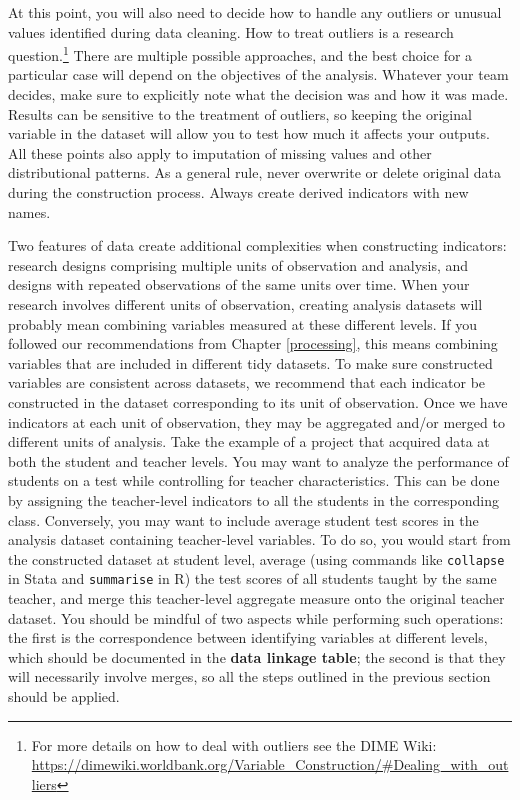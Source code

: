 \documentclass[
]{book}
\begin{document}
At this point, you will also need to decide
how to handle any outliers or unusual values identified during data cleaning.
How to treat outliers is a research question.\footnote{For more details on how to deal with outliers
  see the DIME Wiki:
  \url{https://dimewiki.worldbank.org/Variable_Construction/\#Dealing_with_outliers}}
There are multiple possible approaches,
and the best choice for a particular case
will depend on the objectives of the analysis.
Whatever your team decides, make sure to explicitly note
what the decision was and how it was made.
Results can be sensitive to the treatment of outliers,
so keeping the original variable in the dataset
will allow you to test how much it affects your outputs.
All these points also apply to imputation of missing values and other distributional patterns.
As a general rule, never overwrite or delete original data during the construction process.
Always create derived indicators with new names.

Two features of data create additional complexities when constructing indicators:
research designs comprising multiple units of observation and analysis,
and designs with repeated observations of the same units over time.
When your research involves different units of observation,
creating analysis datasets will probably mean combining variables measured at these different levels.
If you followed our recommendations from Chapter \ref{processing},
this means combining variables that are included in different tidy datasets.
To make sure constructed variables are consistent across datasets,
we recommend that each indicator be constructed in the dataset corresponding to its unit of observation.
Once we have indicators at each unit of observation,
they may be aggregated and/or merged to different units of analysis.
Take the example of a project that acquired data at both the student and teacher levels.
You may want to analyze the performance of students on a test
while controlling for teacher characteristics.
This can be done by assigning the teacher-level indicators to all the students in the corresponding class.
Conversely, you may want to include average student test scores
in the analysis dataset containing teacher-level variables.
To do so, you would start from the constructed dataset at student level,
average (using commands like \texttt{collapse} in Stata and \texttt{summarise} in R)
the test scores of all students taught by the same teacher,
and merge this teacher-level aggregate measure onto the original teacher dataset.
You should be mindful of two aspects while performing such operations:
the first is the correspondence between identifying variables at different levels,
which should be documented in the \textbf{data linkage table};
the second is that they will necessarily involve merges,
so all the steps outlined in the previous section should be applied.
\end{document}
